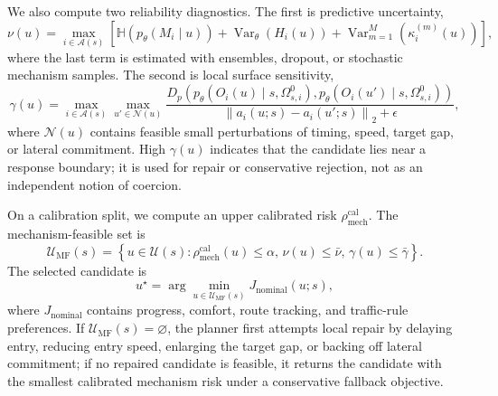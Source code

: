 \documentclass[10pt]{article}
\newcommand{\cA}{\mathcal{A}}
\newcommand{\cN}{\mathcal{N}}
\newcommand{\cU}{\mathcal{U}}
\begin{document}
We also compute two reliability diagnostics. The first is predictive uncertainty,
\begin{equation}
    \nu(u)
    =
    \max_{i\in\cA(s)}
    \left[
    \mathbb H\!\left(p_\theta(M_i\mid u)\right)
    +
    \operatorname{Var}_\theta(H_i(u))
    +
    \operatorname{Var}_{m=1}^{M}\!\left(\kappa_i^{(m)}(u)\right)
    \right],
    \label{eq:uncertainty_diagnostic}
\end{equation}
where the last term is estimated with ensembles, dropout, or stochastic mechanism samples. The second is local surface sensitivity,
\begin{equation}
    \gamma(u)
    =
    \max_{i\in\cA(s)}
    \max_{u'\in\cN(u)}
    \frac{
    D_p\!\left(
    p_\theta(O_i(u)\mid s,\Omega_{s,i}^{0}),
    p_\theta(O_i(u')\mid s,\Omega_{s,i}^{0})
    \right)}
    {\left\|a_i(u;s)-a_i(u';s)\right\|_2+\epsilon},
    \label{eq:surface_sensitivity}
\end{equation}
where \(\cN(u)\) contains feasible small perturbations of timing, speed, target gap, or lateral commitment. High \(\gamma(u)\) indicates that the candidate lies near a response boundary; it is used for repair or conservative rejection, not as an independent notion of coercion.

On a calibration split, we compute an upper calibrated risk \(\rho_{\mathrm{mech}}^{\mathrm{cal}}\). The mechanism-feasible set is
\begin{equation}
    \cU_{\mathrm{MF}}(s)
    =
    \left\{
    u\in\cU(s):
    \rho_{\mathrm{mech}}^{\mathrm{cal}}(u)\le \alpha,\,
    \nu(u)\le \bar\nu,\,
    \gamma(u)\le \bar\gamma
    \right\}.
    \label{eq:mechanism_feasible_set}
\end{equation}
The selected candidate is
\begin{equation}
    u^\star
    =
    \arg\min_{u\in\cU_{\mathrm{MF}}(s)}
    J_{\mathrm{nominal}}(u;s),
    \label{eq:mechanism_feasible_selector}
\end{equation}
where \(J_{\mathrm{nominal}}\) contains progress, comfort, route tracking, and traffic-rule preferences. If \(\cU_{\mathrm{MF}}(s)=\varnothing\), the planner first attempts local repair by delaying entry, reducing entry speed, enlarging the target gap, or backing off lateral commitment; if no repaired candidate is feasible, it returns the candidate with the smallest calibrated mechanism risk under a conservative fallback objective.
\end{document}
